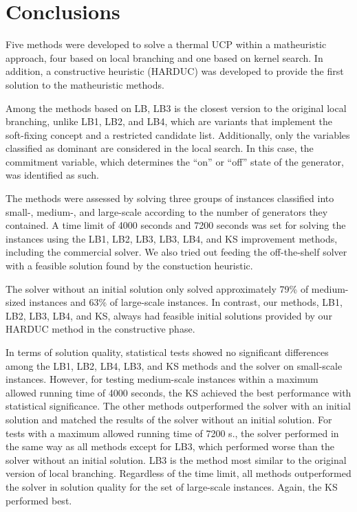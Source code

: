 \section{Conclusions}
\label{sec:Conclusions}

Five methods were developed to solve a thermal UCP within a matheuristic approach, four based on local branching and one based on kernel search. In addition, a constructive heuristic (HARDUC) was developed to provide the first solution to the matheuristic methods.

Among the methods based on LB, LB3 is the closest version to the original local branching, unlike LB1, LB2, and LB4, which are variants that implement the soft-fixing concept and a restricted candidate list. Additionally, only the variables classified as dominant are considered in the local search. In this case, the commitment variable, which determines the ``on'' or ``off'' state of the generator, was identified as such.


The methods were assessed by solving three groups of instances classified into small-, medium-, and large-scale according to the number of generators they contained. A time limit of 4000 seconds and 7200 seconds was set for solving the instances using the LB1, LB2, LB3, LB3, LB4, and KS improvement methods, including the commercial solver. We also tried out feeding the off-the-shelf solver with a feasible solution
found by the constuction heuristic.  

The solver without an initial solution only solved approximately 79\% of medium-sized instances and 63\% of large-scale instances. In contrast, our methods, LB1, LB2, LB3, LB4, and KS, always had feasible initial solutions provided by our HARDUC method in the constructive phase.

In terms of solution quality, statistical tests showed no significant differences among the LB1, LB2, LB4, LB3, and KS methods and the solver on small-scale instances. However,
for testing medium-scale instances within a maximum allowed running time of 4000 seconds, the KS achieved the best performance with statistical significance. The other methods outperformed the solver with an initial solution and matched the results of the solver without an initial solution. For tests with a maximum allowed running time of 7200 s., the solver performed in the same way as all methods except for LB3, which performed worse than the solver without an initial solution. 
LB3 is the method most similar to the original version of local branching.
%
Regardless of the time limit, all methods outperformed the solver in solution quality for the set of large-scale instances.
Again, the KS performed best.

